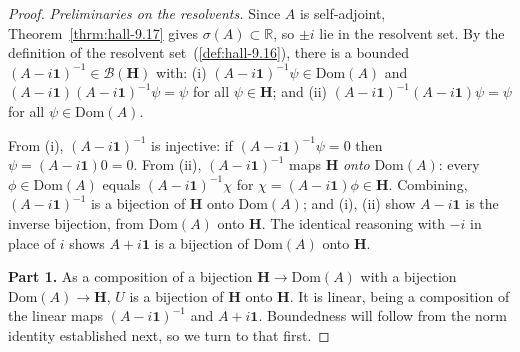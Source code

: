 \begin{proof}
    \leanok
\textit{Preliminaries on the resolvents.} Since $A$ is self-adjoint, Theorem~\ref{thrm:hall-9.17} gives $\sigma(A) \subset \mathbb{R}$, so $\pm i$ lie in the resolvent set. By the definition of the resolvent set~(\ref{def:hall-9.16}), there is a bounded $(A-i\mathbf{1})^{-1} \in \mathcal{B}(\mathbf{H})$ with: (i) $(A-i\mathbf{1})^{-1}\psi \in \text{Dom}(A)$ and $(A-i\mathbf{1})(A-i\mathbf{1})^{-1}\psi = \psi$ for all $\psi \in \mathbf{H}$; and (ii) $(A-i\mathbf{1})^{-1}(A-i\mathbf{1})\psi = \psi$ for all $\psi \in \text{Dom}(A)$.

From (i), $(A-i\mathbf{1})^{-1}$ is injective: if $(A-i\mathbf{1})^{-1}\psi = 0$ then $\psi = (A-i\mathbf{1})0 = 0$. From (ii), $(A-i\mathbf{1})^{-1}$ maps $\mathbf{H}$ \textit{onto} $\text{Dom}(A)$: every $\phi \in \text{Dom}(A)$ equals $(A-i\mathbf{1})^{-1}\chi$ for $\chi = (A-i\mathbf{1})\phi \in \mathbf{H}$. Combining, $(A-i\mathbf{1})^{-1}$ is a bijection of $\mathbf{H}$ onto $\text{Dom}(A)$; and (i), (ii) show $A - i\mathbf{1}$ is the inverse bijection, from $\text{Dom}(A)$ onto $\mathbf{H}$. The identical reasoning with $-i$ in place of $i$ shows $A + i\mathbf{1}$ is a bijection of $\text{Dom}(A)$ onto $\mathbf{H}$.

\textbf{Part 1.} As a composition of a bijection $\mathbf{H} \to \text{Dom}(A)$ with a bijection $\text{Dom}(A) \to \mathbf{H}$, $U$ is a bijection of $\mathbf{H}$ onto $\mathbf{H}$. It is linear, being a composition of the linear maps $(A-i\mathbf{1})^{-1}$ and $A+i\mathbf{1}$. Boundedness will follow from the norm identity established next, so we turn to that first.


\end{proof}
